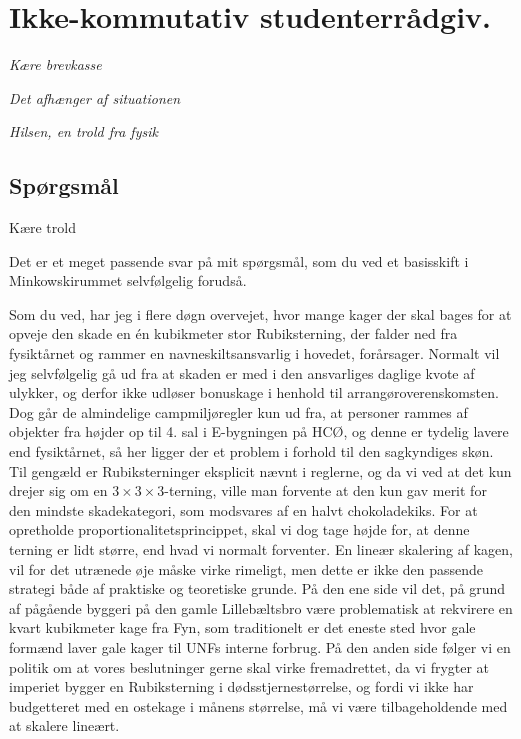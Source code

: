

\begin{minipage}[b]{0.95\linewidth}
\begin{minipage}[t]{0.47\textwidth}
\vspace{1mm}
\section*{Ikke-kommutativ studenterrådgiv.}
\emph{Kære brevkasse}

\emph{Det afhænger af situationen}

\emph{Hilsen, en trold fra fysik}

\subsection*{Spørgsmål}

Kære trold

Det er et meget passende svar på mit spørgsmål, som du ved et basisskift i Minkowskirummet selvfølgelig forudså.

Som du ved, har jeg i flere døgn overvejet, hvor mange kager der skal bages for at opveje den skade en én kubikmeter stor Rubiksterning, der falder ned fra fysiktårnet og rammer en navneskiltsansvarlig i hovedet, forårsager. Normalt vil jeg selvfølgelig gå ud fra at skaden er med i den ansvarliges daglige kvote af ulykker, og derfor ikke udløser bonuskage i henhold til arrangøroverenskomsten. Dog går de almindelige campmiljøregler kun ud fra, at personer rammes af objekter fra højder op til 4. sal i E-bygningen på HCØ, og denne er tydelig lavere end fysiktårnet, så her ligger der et problem i forhold til den sagkyndiges skøn. Til gengæld er Rubiksterninger eksplicit nævnt i reglerne, og da vi ved at det kun drejer sig om en $3 \times 3 \times 3$-terning, ville man forvente at den kun gav merit for den mindste skadekategori, som modsvares af en halvt chokoladekiks. For at opretholde proportionalitetsprincippet, skal vi dog tage højde for, at denne terning er lidt større, end hvad vi normalt forventer. En lineær skalering af kagen, vil for det utrænede øje måske virke rimeligt, men dette er ikke den passende strategi både af praktiske og teoretiske grunde. På den ene side vil det, på grund af pågående byggeri på den gamle Lillebæltsbro være problematisk at rekvirere en kvart kubikmeter kage fra Fyn, som traditionelt er det eneste sted hvor gale formænd laver gale kager til UNFs interne forbrug. På den anden side følger vi en politik om at vores beslutninger gerne skal virke fremadrettet, da vi frygter at imperiet bygger en Rubiksterning i dødsstjernestørrelse, og fordi vi ikke har budgetteret med en ostekage i månens størrelse, må vi være tilbageholdende med at skalere lineært.


\end{minipage}
\end{minipage}
